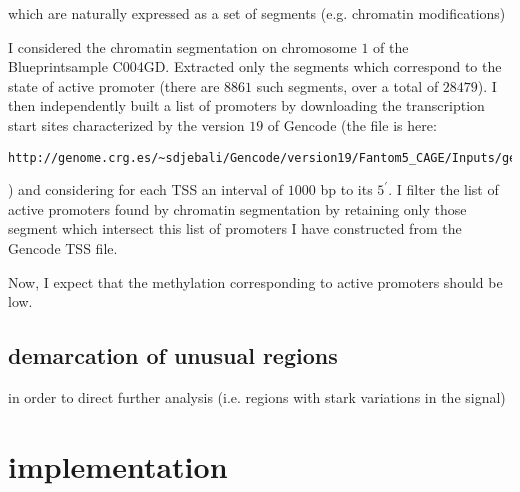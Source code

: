 \documentclass[11pt]{amsart}
\begin{document}
which are naturally expressed as a set of 
segments (e.g. chromatin modifications)


I considered the chromatin segmentation on chromosome $1$ of the
Blueprintsample C004GD. Extracted only the segments which correspond
to the state of active promoter (there are $8861$ such segments, over a total
of $28479$).
I then independently built a list of promoters by downloading the transcription
start sites characterized by the version $19$ of Gencode (the file is here:
\begin{verbatim}
http://genome.crg.es/~sdjebali/Gencode/version19/Fantom5_CAGE/Inputs/gencode.v19.TSS.notlow.gffA
\end{verbatim}
)
and considering for each TSS an interval of $1000$ bp to its $5^\prime$.
I filter the list of active promoters found by chromatin segmentation
by retaining only those segment which intersect this list of promoters
I have constructed from the Gencode TSS file.

Now, I expect that the methylation corresponding to active promoters should be
low.

\subsection{demarcation of unusual regions} 
in order to direct further analysis 
(i.e. regions with stark variations in the signal)

\section{implementation}



\end{document}
